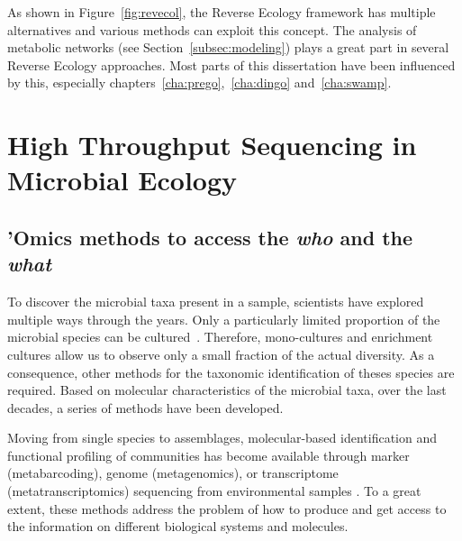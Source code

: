       As shown in Figure~\ref{fig:revecol}, the Reverse Ecology framework 
      has multiple alternatives and various methods can exploit this concept.
      The analysis of metabolic networks (see Section~\ref{subsec:modeling}) 
      plays a great part in several Reverse Ecology approaches.
      Most parts of this dissertation have been influenced by this, especially 
      chapters~\ref{cha:prego},~\ref{cha:dingo} and~\ref{cha:swamp}.
      



\section{High Throughput Sequencing in Microbial Ecology}

   \subsection{'Omics methods to access the \textit{who} and the \textit{what}}
   \label{subsec:omics}
      To discover the microbial taxa present in a sample, scientists have 
      explored multiple ways through the years. 
      Only a particularly limited proportion of the microbial species 
      can be cultured~\citep{steen2019high}.
      Therefore, mono-cultures and enrichment cultures allow us to observe 
      only a small fraction of the actual diversity. 
      As a consequence, other methods for the taxonomic identification of theses
      species are required.
      Based on molecular characteristics of the microbial taxa, 
      over the last decades, a series of methods have been developed. 
 
      Moving from single species to assemblages, molecular-based identification and functional 
      profiling of communities has become available through marker (metabarcoding), 
      genome (metagenomics), or transcriptome (metatranscriptomics) sequencing from environmental 
      samples \citep{goldford2018emergent}. 
      To a great extent, these methods address the problem of how to produce and get access 
      to the information on different biological systems and molecules.

